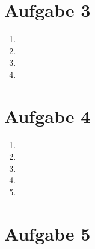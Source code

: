 \documentclass[a4paper,10pt]{article}
\begin{document}
\section*{Aufgabe 3}

\begin{enumerate}[~~a)]
    \item

    \item

    \item

    \item
\end{enumerate}

\section*{Aufgabe 4}

\begin{enumerate}[~~a)]
    \item

    \item

    \item

    \item

    \item
\end{enumerate}

\section*{Aufgabe 5}
\end{document}
